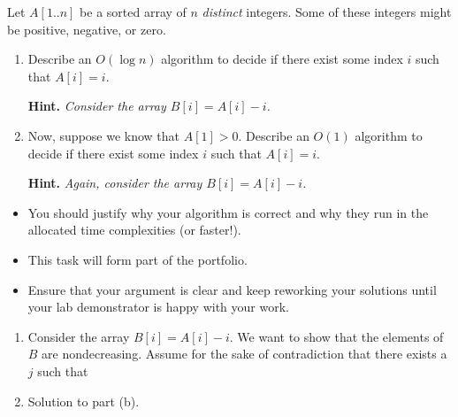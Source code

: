 \documentclass{article}
\begin{document}
\begin{question}
Let $A[1..n]$ be a sorted array of $n$ {\em distinct} integers. Some of these integers might be positive, negative, or zero.
\begin{enumerate}[label = (\alph*)]
    \item Describe an $O(\log n)$ algorithm to decide if there exist some index $i$ such that $A[i] = i$.

    {\bfseries Hint.} {\em Consider the array $B[i] = A[i] - i$.}

    \item Now, suppose we know that $A[1] > 0$. Describe an $O(1)$ algorithm to decide if there exist some index $i$ such that $A[i] = i$.

    {\bfseries Hint.} {\em Again, consider the array $B[i] = A[i] - i$.}
\end{enumerate}
\end{question}

\begin{rubric}
\begin{itemize}
    \item You should justify why your algorithm is correct and why they run in the allocated time complexities (or faster!).

    \item This task will form part of the portfolio.
    \item Ensure that your argument is clear and keep reworking your solutions until your lab demonstrator is happy with your work.
\end{itemize}
\end{rubric}

\begin{solution}
\begin{enumerate}[label = (\alph*)]
    \item Consider the array $B[i]=A[i]-i$. We want to show that the elements of $B$ are nondecreasing.
    Assume for the sake of contradiction that there exists a $j$ such that 

    \item Solution to part (b).
\end{enumerate}
\end{solution}
\end{document}
